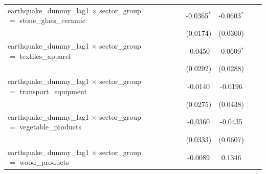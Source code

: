\begin{tabular}{lcccccccc}
   earthquake\_dummy\_lag1 $\times$ sector\_group $=$ stone\_glass\_ceramic       &                       &                       &                       &                       & -0.0365$^{*}$         & -0.0603$^{*}$         &                       &   \\   
                                                                                  &                       &                       &                       &                       & (0.0174)              & (0.0300)              &                       &   \\   
   earthquake\_dummy\_lag1 $\times$ sector\_group $=$ textiles\_apparel           &                       &                       &                       &                       & -0.0450               & -0.0609$^{*}$         &                       &   \\   
                                                                                  &                       &                       &                       &                       & (0.0292)              & (0.0288)              &                       &   \\   
   earthquake\_dummy\_lag1 $\times$ sector\_group $=$ transport\_equipment        &                       &                       &                       &                       & -0.0140               & -0.0196               &                       &   \\   
                                                                                  &                       &                       &                       &                       & (0.0275)              & (0.0438)              &                       &   \\   
   earthquake\_dummy\_lag1 $\times$ sector\_group $=$ vegetable\_products         &                       &                       &                       &                       & -0.0360               & -0.0435               &                       &   \\   
                                                                                  &                       &                       &                       &                       & (0.0333)              & (0.0607)              &                       &   \\   
   earthquake\_dummy\_lag1 $\times$ sector\_group $=$ wood\_products              &                       &                       &                       &                       & -0.0089               & 0.1346                &                       &   \\   

\end{tabular}
